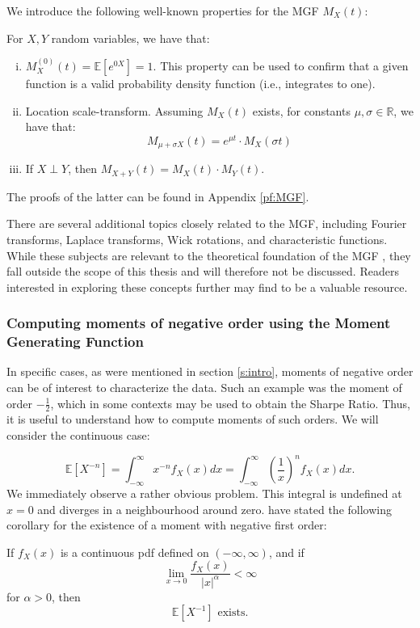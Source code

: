 We introduce the following well-known properties for the MGF \(M_X(t)\):
\begin{proposition}\label{p: moments}
    For \(X, Y\) random variables, we have that:
    \begin{enumerate}[(i)]
        \item \(M_X^{(0)}(t) = \mathbb{E}[e^{0X}] = 1\). This property can be used to confirm that a given function is a valid probability density function (i.e., integrates to one).
        \item Location scale-transform. Assuming \(M_X(t)\) exists, for constants \(\mu, \sigma \in \mathbb{R}\), we have that: 
        \[M_{\mu + \sigma X}(t) = e^{\mu t} \cdot M_X(\sigma t)\]
        \item If \(X \perp Y\), then \(M_{X+Y}(t) = M_X(t)\cdot M_Y(t)\).
    \end{enumerate}
\end{proposition}


The proofs of the latter can be found in Appendix \ref{pf:MGF}.

There are several additional topics closely related to the MGF, including Fourier transforms, Laplace transforms, Wick rotations, and characteristic functions. While these subjects are relevant to the theoretical foundation of the MGF , they fall outside the scope of this thesis and will therefore not be discussed. Readers interested in exploring these concepts further may find \citet{kolmogorov1999} to be a valuable resource.

\subsubsection{Computing moments of negative order using the Moment Generating Function}
In specific cases, as were mentioned in section \ref{s:intro}, moments of negative order can be of interest to characterize the data. Such an example was the moment of order \(-\frac{1}{2}\), which in some contexts may be used to obtain the Sharpe Ratio. Thus, it is useful to understand how to compute moments of such orders. We will consider the continuous case:

\[\mathbb{E}[X^{-n}] = \int_{-\infty}^{\infty} x^{-n} f_X(x) dx = \int_{-\infty}^{\infty} \left(\frac{1}{x}\right)^n f_X(x) dx.\] We immediately observe a rather obvious problem. This integral is undefined at \(x = 0\) and diverges in a neighbourhood around zero. \citet{khuri2002} have stated the following corollary for the existence of a moment with negative first order:
\begin{corollary}
    If \(f_X(x)\) is a continuous pdf defined on \((-\infty, \infty)\), and if \[\lim_{x \to 0} \frac{f_X(x)}{|x|^\alpha} < \infty\] for \(\alpha > 0\), then \[\mathbb{E}[X^{-1}] \text{ exists}.\]
\end{corollary}

